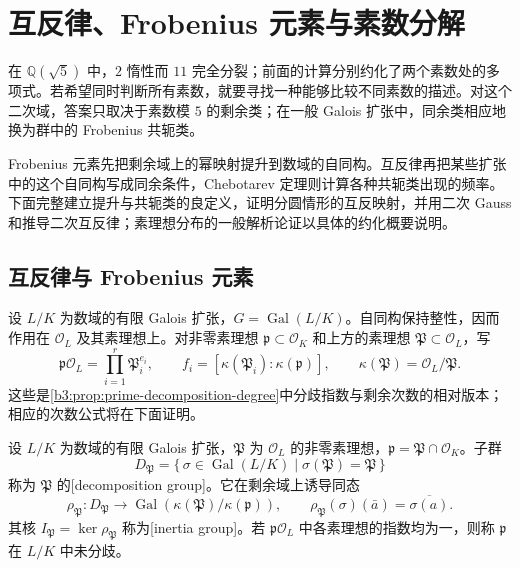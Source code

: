
\section{互反律、Frobenius 元素与素数分解}
\label{b3:sec:A05}

在 \(\mathbb Q(\sqrt5)\) 中，\(2\) 惰性而 \(11\) 完全分裂；前面的计算分别约化了两个素数处的多项式。若希望同时判断所有素数，就要寻找一种能够比较不同素数的描述。对这个二次域，答案只取决于素数模 \(5\) 的剩余类；在一般 Galois 扩张中，同余类相应地换为群中的 Frobenius 共轭类。

\ProseParagraphBreak
Frobenius 元素先把剩余域上的幂映射提升到数域的自同构。互反律再把某些扩张中的这个自同构写成同余条件，Chebotarev 定理则计算各种共轭类出现的频率。下面完整建立提升与共轭类的良定义，证明分圆情形的互反映射，并用二次 Gauss 和推导二次互反律；素理想分布的一般解析论证以具体的约化概要说明。

\subsection{互反律与 Frobenius 元素}
\label{b3:subsec:A05:01}

设 \(L/K\) 为数域的有限 Galois 扩张，\(G=\operatorname{Gal}(L/K)\)。自同构保持整性，因而作用在 \(\mathcal O_L\) 及其素理想上。对非零素理想 \(\mathfrak p\subset\mathcal O_K\) 和上方的素理想 \(\mathfrak P\subset\mathcal O_L\)，写
\[
	\mathfrak p\mathcal O_L=\prod_{i=1}^r\mathfrak P_i^{e_i},\qquad
	f_i=[\kappa(\mathfrak P_i):\kappa(\mathfrak p)],\qquad
	\kappa(\mathfrak P)=\mathcal O_L/\mathfrak P.
\]
这些是\cref{b3:prop:prime-decomposition-degree}中分歧指数与剩余次数的相对版本；相应的次数公式将在下面证明。

\begin{definition}\label{b3:def:arithmetic-decomposition-inertia}
	设 \(L/K\) 为数域的有限 Galois 扩张，\(\mathfrak P\) 为 \(\mathcal O_L\) 的非零素理想，\(\mathfrak p=\mathfrak P\cap\mathcal O_K\)。子群
	\[
		D_{\mathfrak P}=\{\,\sigma\in\operatorname{Gal}(L/K)\mid\sigma(\mathfrak P)=\mathfrak P\,\}
	\]
	称为 \(\mathfrak P\) 的[decomposition group]。它在剩余域上诱导同态
	\[
		\rho_{\mathfrak P}:D_{\mathfrak P}\longrightarrow
		\operatorname{Gal}(\kappa(\mathfrak P)/\kappa(\mathfrak p)),\qquad
		\rho_{\mathfrak P}(\sigma)(\bar a)=\overline{\sigma(a)}.
	\]
	其核 \(I_{\mathfrak P}=\ker\rho_{\mathfrak P}\) 称为[inertia group]。若 \(\mathfrak p\mathcal O_L\) 中各素理想的指数均为一，则称 \(\mathfrak p\) 在 \(L/K\) 中未分歧。
\end{definition}

